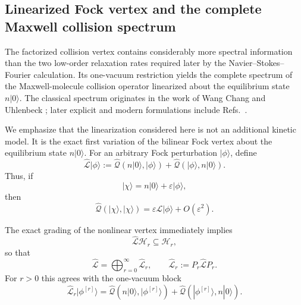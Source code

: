 \documentclass[11pt,oneside]{article}
\numberwithin{equation}{section}
\theoremstyle{definition}
\begin{document}
\subsection{Linearized Fock vertex and the complete Maxwell collision spectrum}

The factorized collision vertex contains considerably more spectral
information than the two low-order relaxation rates required later by the
Navier--Stokes--Fourier calculation.  Its one-vacuum restriction yields
the complete spectrum of the Maxwell-molecule collision operator
linearized about the equilibrium state $n|0\rangle$.  The classical
spectrum originates in the work of Wang Chang and Uhlenbeck
\cite{WangChangUhlenbeck1952,WangChangUhlenbeck1970}; later explicit and
modern formulations include Refs.~\cite{AltermanFrankowskiPekeris1962,LernerMorimotoPravdaStarovXu2013}.

We emphasize that the linearization considered here is not an additional
kinetic model.  It is the exact first variation of the bilinear Fock
vertex about the equilibrium state $n|0\rangle$.  For an arbitrary Fock
perturbation $|\phi\rangle$, define
\begin{equation}
\widehat{\mathcal L}|\phi\rangle
:=
\widehat{\mathcal Q}(n|0\rangle,|\phi\rangle)
+
\widehat{\mathcal Q}(|\phi\rangle,n|0\rangle).
\label{eq:maxwell_full_linearized_Fock_operator}
\end{equation}
Thus, if
\begin{equation}
|\chi\rangle=n|0\rangle+\varepsilon|\phi\rangle,
\end{equation}
then
\begin{equation}
\widehat{\mathcal Q}(|\chi\rangle,|\chi\rangle)
=
\varepsilon\widehat{\mathcal L}|\phi\rangle
+
O(\varepsilon^2).
\end{equation}

The exact grading of the nonlinear vertex immediately implies
\begin{equation}
\widehat{\mathcal L}\mathscr H_r
\subseteq
\mathscr H_r,
\label{eq:maxwell_linearized_preserves_grade}
\end{equation}
so that
\begin{equation}
\widehat{\mathcal L}
=
\bigoplus_{r=0}^{\infty}\widehat{\mathcal L}_r,
\qquad
\widehat{\mathcal L}_r
:=
P_r\widehat{\mathcal L}P_r .
\end{equation}
For $r>0$ this agrees with the one-vacuum block
\begin{equation}
\widehat{\mathcal L}_r|\phi^{[r]}\rangle
=
\widehat{\mathcal Q}(n|0\rangle,|\phi^{[r]}\rangle)
+
\widehat{\mathcal Q}(|\phi^{[r]}\rangle,n|0\rangle).
\label{eq:maxwell_exact_one_vacuum_block}
\end{equation}
\end{document}
